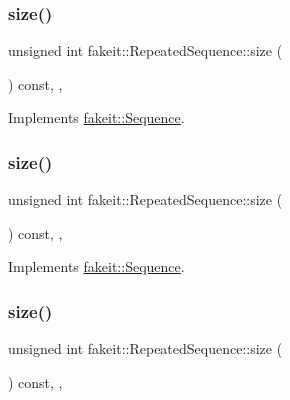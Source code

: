 \subsubsection{\texorpdfstring{size()}{size()}\hspace{0.1cm}{\footnotesize\ttfamily [4/9]}}
{\footnotesize\ttfamily unsigned int fakeit\+::\+Repeated\+Sequence\+::size (\begin{DoxyParamCaption}{ }\end{DoxyParamCaption}) const\hspace{0.3cm}{\ttfamily [inline]}, {\ttfamily [override]}, {\ttfamily [virtual]}}



Implements \mbox{\hyperlink{classfakeit_1_1Sequence_aa9a45b45fc715148832a9dfb7b555556}{fakeit\+::\+Sequence}}.

\mbox{\label{classfakeit_1_1RepeatedSequence_a64d52ac14ca69a34e8188e856e6b51a6}} 
\subsubsection{\texorpdfstring{size()}{size()}\hspace{0.1cm}{\footnotesize\ttfamily [5/9]}}
{\footnotesize\ttfamily unsigned int fakeit\+::\+Repeated\+Sequence\+::size (\begin{DoxyParamCaption}{ }\end{DoxyParamCaption}) const\hspace{0.3cm}{\ttfamily [inline]}, {\ttfamily [override]}, {\ttfamily [virtual]}}



Implements \mbox{\hyperlink{classfakeit_1_1Sequence_aa9a45b45fc715148832a9dfb7b555556}{fakeit\+::\+Sequence}}.

\mbox{\label{classfakeit_1_1RepeatedSequence_a64d52ac14ca69a34e8188e856e6b51a6}} 
\subsubsection{\texorpdfstring{size()}{size()}\hspace{0.1cm}{\footnotesize\ttfamily [6/9]}}
{\footnotesize\ttfamily unsigned int fakeit\+::\+Repeated\+Sequence\+::size (\begin{DoxyParamCaption}{ }\end{DoxyParamCaption}) const\hspace{0.3cm}{\ttfamily [inline]}, {\ttfamily [override]}, {\ttfamily [virtual]}}



